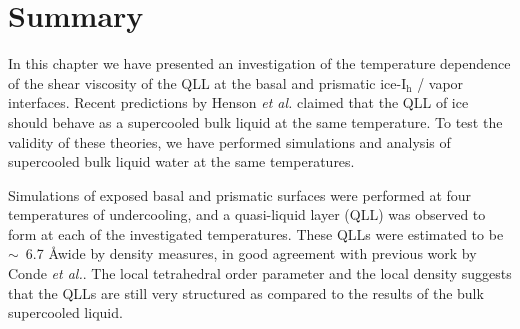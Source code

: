 

\section{Summary}
In this chapter we have presented an investigation of the temperature
dependence of the shear viscosity of the QLL at the basal and
prismatic ice-I$_\mathrm{h}$ / vapor interfaces.  Recent predictions
by Henson \textit{et al.} claimed that the QLL of ice should behave as
a supercooled bulk liquid at the same temperature.\cite{Henson2005} To
test the validity of these theories, we have performed simulations and
analysis of supercooled bulk liquid water at the same temperatures.

Simulations of exposed basal and prismatic surfaces were performed at
four temperatures of undercooling, and a quasi-liquid layer (QLL) was
observed to form at each of the investigated temperatures. These QLLs
were estimated to be $\sim $~6.7 \AA wide by density measures, in good
agreement with previous work by Conde \textit{et al.}.\cite{Conde2008}
The local tetrahedral order parameter and the local density suggests
that the QLLs are still very structured as compared to the results of
the bulk supercooled liquid. 

